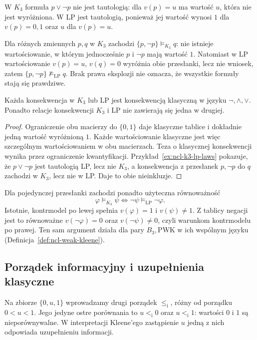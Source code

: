 \begin{przyklad}\label{ex:ncl-k3-lp-laws}
W $K_3$ formuła $p\vee\neg p$ nie jest tautologią:
dla $v(p)=u$ ma wartość $u$, która nie jest wyróżniona.
W LP jest tautologią, ponieważ jej wartość wynosi
$1$ dla $v(p)=0,1$ oraz $u$ dla $v(p)=u$.

Dla różnych zmiennych $p,q$ w $K_3$ zachodzi
$\{p,\neg p\}\models_{K_3}q$:
nie istnieje wartościowanie, w którym jednocześnie
$p$ i $\neg p$ mają wartość $1$.
Natomiast w LP wartościowanie $v(p)=u$, $v(q)=0$
wyróżnia obie przesłanki, lecz nie wniosek, zatem
$\{p,\neg p\}\not\models_{\mathrm{LP}}q$.
Brak prawa eksplozji nie oznacza, że wszystkie
formuły stają się prawdziwe.
\end{przyklad}
\begin{stwierdzenie}
\label{prop:ncl-k3-lp-classical}
Każda konsekwencja w $K_3$ lub LP jest konsekwencją
klasyczną w języku $\neg,\wedge,\vee$.
Ponadto relacje konsekwencji $K_3$ i LP
nie zawierają się jedna w drugiej.
\end{stwierdzenie}
\begin{proof}
Ograniczenie obu macierzy do $\{0,1\}$ daje
klasyczne tablice i dokładnie jedną wartość wyróżnioną $1$.
Każde wartościowanie klasyczne jest więc szczególnym
wartościowaniem w obu macierzach. Teza o klasycznej
konsekwencji wynika przez ograniczenie kwantyfikacji.
Przykład~\ref{ex:ncl-k3-lp-laws} pokazuje, że
$p\vee\neg p$ jest tautologią LP, lecz nie $K_3$,
a konsekwencja z przesłanek $p,\neg p$ do $q$
zachodzi w $K_3$, lecz nie w LP.
Daje to obie nieinkluzje.
\end{proof}
Dla pojedynczej przesłanki zachodzi ponadto użyteczna
równoważność
\[
 \varphi\models_{K_3}\psi
 \iff \neg\psi\models_{\mathrm{LP}}\neg\varphi.
\]
Istotnie, kontrmodel po lewej spełnia
$v(\varphi)=1$ i $v(\psi)\ne1$. Z tablicy negacji
jest to równoważne $v(\neg\varphi)=0$ oraz
$v(\neg\psi)\ne0$, czyli warunkom kontrmodelu
po prawej. Ten sam argument działa dla pary
$B_3,\mathrm{PWK}$ w ich wspólnym języku
(Definicja~\ref{def:ncl-weak-kleene}).

\subsection{Porządek informacyjny i uzupełnienia klasyczne}
Na zbiorze $\{0,u,1\}$ wprowadzamy drugi porządek
$\leq_{\mathrm i}$, różny od porządku $0<u<1$.
Jego jedyne ostre porównania to $u<_{\mathrm i}0$
oraz $u<_{\mathrm i}1$: wartości $0$ i $1$ są
nieporównywalne. W interpretacji Kleene'ego zastąpienie
$u$ jedną z nich odpowiada uzupełnieniu informacji.
\begin{center}
\end{center}

